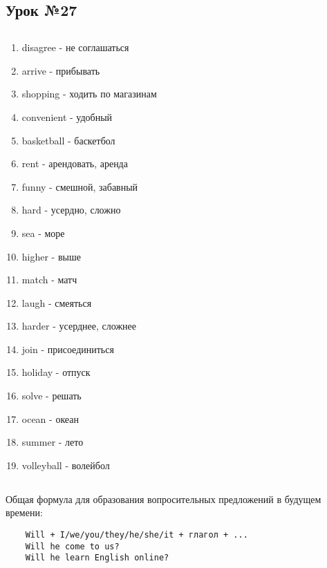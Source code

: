 \subsection{Урок №27}

\subsection*{}
\begin{multicols}{2}
    \begin{enumerate}\setlength{\itemsep}{0pt}
        \item disagree - не соглашаться
        \item arrive - прибывать
        \item shopping - ходить по магазинам
        \item convenient - удобный
        \item basketball - баскетбол
        \item rent - арендовать, аренда
        \item funny - смешной, забавный
        \item hard - усердно, сложно
        \item sea - море
        \item higher - выше
        \item match - матч
        \item laugh - смеяться
        \item harder - усерднее, сложнее
        \item join - присоединиться
        \item holiday - отпуск
        \item solve - решать
        \item ocean - океан
        \item summer - лето
        \item volleyball - волейбол
    \end{enumerate}
\end{multicols}

\subsection*{}
Общая формула для образования вопросительных предложений в будущем времени:
\begin{verbatim}
    Will + I/we/you/they/he/she/it + глагол + ...
    Will he come to us?
    Will he learn English online?
\end{verbatim}

